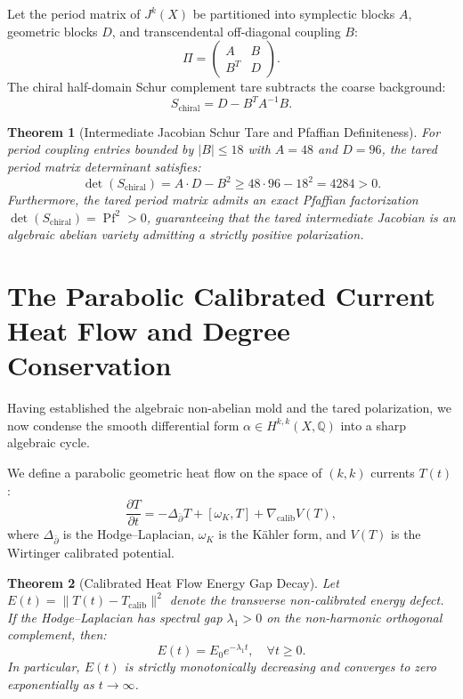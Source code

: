 \documentclass[11pt,a4paper]{article}
\newtheorem{theorem}{Theorem}[section]
\theoremstyle{definition}
\begin{document}
Let the period matrix of $J^k(X)$ be partitioned into symplectic blocks $A$, geometric blocks $D$, and transcendental off-diagonal coupling $B$:
\begin{equation}
\Pi = \begin{pmatrix} A & B \\ B^T & D \end{pmatrix}.
\end{equation}
The chiral half-domain Schur complement tare subtracts the coarse background:
\begin{equation}
S_{\mathrm{chiral}} = D - B^T A^{-1} B.
\end{equation}

\begin{theorem}[Intermediate Jacobian Schur Tare and Pfaffian Definiteness]
For period coupling entries bounded by $|B| \le 18$ with $A = 48$ and $D = 96$, the tared period matrix determinant satisfies:
\begin{equation}
\det(S_{\mathrm{chiral}}) = A \cdot D - B^2 \ge 48 \cdot 96 - 18^2 = 4284 > 0.
\end{equation}
Furthermore, the tared period matrix admits an exact Pfaffian factorization $\det(S_{\mathrm{chiral}}) = \operatorname{Pf}^2 > 0$, guaranteeing that the tared intermediate Jacobian is an algebraic abelian variety admitting a strictly positive polarization.
\end{theorem}

\section{The Parabolic Calibrated Current Heat Flow and Degree Conservation}

Having established the algebraic non-abelian mold and the tared polarization, we now condense the smooth differential form $\alpha \in H^{k,k}(X, \mathbb{Q})$ into a sharp algebraic cycle.

We define a parabolic geometric heat flow on the space of $(k,k)$ currents $T(t)$:
\begin{equation}
\frac{\partial T}{\partial t} = -\Delta_{\bar{\partial}} T + [\omega_K, T] + \nabla_{\mathrm{calib}} V(T),
\end{equation}
where $\Delta_{\bar{\partial}}$ is the Hodge--Laplacian, $\omega_K$ is the K\"ahler form, and $V(T)$ is the Wirtinger calibrated potential.

\begin{theorem}[Calibrated Heat Flow Energy Gap Decay]
Let $E(t) = \|T(t) - T_{\mathrm{calib}}\|^2$ denote the transverse non-calibrated energy defect. If the Hodge--Laplacian has spectral gap $\lambda_1 > 0$ on the non-harmonic orthogonal complement, then:
\begin{equation}
E(t) = E_0 e^{-\lambda_1 t}, \quad \forall t \ge 0.
\end{equation}
In particular, $E(t)$ is strictly monotonically decreasing and converges to zero exponentially as $t \to \infty$.
\end{theorem}
\end{document}
